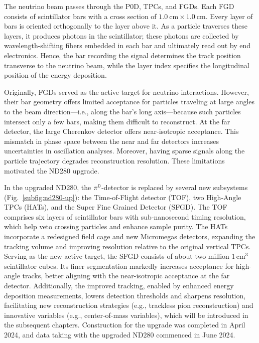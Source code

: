 The neutrino beam passes through the P0D, TPCs, and FGDs.  
Each FGD consists of scintillator bars with a cross section of \(1.0~\mathrm{cm} \times 1.0~\mathrm{cm}\).  
Every layer of bars is oriented orthogonally to the layer above it.  
As a particle traverses these layers, it produces photons in the scintillator; these photons are collected by wavelength-shifting fibers embedded in each bar and ultimately read out by end electronics.  
Hence, the bar recording the signal determines the track position transverse to the neutrino beam, while the layer index specifies the longitudinal position of the energy deposition.

Originally, FGDs served as the active target for neutrino interactions.  
However, their bar geometry offers limited acceptance for particles traveling at large angles to the beam direction—i.e., along the bar’s long axis—because such particles intersect only a few bars, making them difficult to reconstruct.  
At the far detector, the large Cherenkov detector offers near-isotropic acceptance.
This mismatch in phase space between the near and far detectors increases uncertainties in oscillation analyses.  
Moreover, having sparse signals along the particle trajectory degrades reconstruction resolution.  
These limitations motivated the ND280 upgrade.

In the upgraded ND280, the \(\pi^0\)-detector is replaced by several new subsystems (Fig.~\ref{subfig:nd280-up}): the Time-of-Flight detector (TOF), two High-Angle TPCs (HATs), and the Super Fine Grained Detector (SFGD).  
The TOF comprises six layers of scintillator bars with sub-nanosecond timing resolution, which help veto crossing particles and enhance sample purity.  
The HATs incorporate a redesigned field cage and new Micromegas detectors, expanding the tracking volume and improving resolution relative to the original vertical TPCs.  
Serving as the new active target, the SFGD consists of about two million \(1\,\mathrm{cm}^3\) scintillator cubes.  
Its finer segmentation markedly increases acceptance for high-angle tracks, better aligning with the near-isotropic acceptance at the far detector.  
Additionally, the improved tracking, enabled by enhanced energy deposition measurements, lowers detection thresholds and sharpens resolution, facilitating new reconstruction strategies (e.g., trackless pion reconstruction) and innovative variables (e.g., center-of-mass variables), which will be introduced in the subsequent chapters.  
Construction for the upgrade was completed in April 2024, and data taking with the upgraded ND280 commenced in June 2024.

